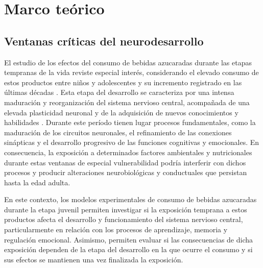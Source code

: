 \chapter{Marco teórico}\label{cap:marco-teorico}

\section{Ventanas críticas del neurodesarrollo}\label{sec:ventanas}

El estudio de los efectos del consumo de bebidas azucaradas durante las etapas tempranas de la vida reviste especial interés, considerando el elevado consumo de estos productos entre niños y adolescentes y su incremento registrado en las últimas décadas \cite{guthrie2000sweeteners,frary2004children,guelinckx2015water,wang2008ssb}. Esta etapa del desarrollo se caracteriza por una intensa maduración y reorganización del sistema nervioso central, acompañada de una elevada plasticidad neuronal y de la adquisición de nuevos conocimientos y habilidades \cite{sisk2004puberty,spear2000adolescent}. Durante este período tienen lugar procesos fundamentales, como la maduración de los circuitos neuronales, el refinamiento de las conexiones sinápticas y el desarrollo progresivo de las funciones cognitivas y emocionales. En consecuencia, la exposición a determinados factores ambientales y nutricionales durante estas ventanas de especial vulnerabilidad podría interferir con dichos procesos y producir alteraciones neurobiológicas y conductuales que persistan hasta la edad adulta.

En este contexto, los modelos experimentales de consumo de bebidas azucaradas durante la etapa juvenil permiten investigar si la exposición temprana a estos productos afecta el desarrollo y funcionamiento del sistema nervioso central, particularmente en relación con los procesos de aprendizaje, memoria y regulación emocional. Asimismo, permiten evaluar si las consecuencias de dicha exposición dependen de la etapa del desarrollo en la que ocurre el consumo y si sus efectos se mantienen una vez finalizada la exposición.

